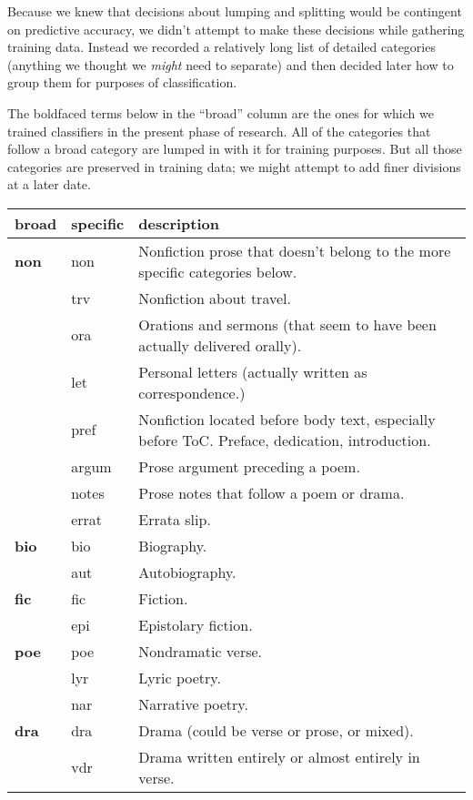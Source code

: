 \documentclass[paper=a4, fontsize=12pt]{scrartcl}
\numberwithin{equation}{section}		%
\numberwithin{figure}{section}			%
\numberwithin{table}{section}				%
\begin{document}
Because we knew that decisions about lumping and splitting would be contingent on predictive accuracy, we didn't attempt to make these decisions while gathering training data. Instead we recorded a relatively long list of detailed categories (anything we thought we \textit{might} need to separate) and then decided later how to group them for purposes of classification.

The boldfaced terms below in the ``broad'' column are the ones for which we trained classifiers in the present phase of research. All of the categories that follow a broad category are lumped in with it for training purposes. But all those categories are preserved in training data; we might attempt to add finer divisions at a later date.

\begin{centering}
\begin{longtable}{ | l | l | p{10cm} |}
\hline
broad & specific & description \\ \hline \hline
\textbf{non} & non & Nonfiction prose that doesn't belong to the more specific categories below. \\ \hline
 & trv & Nonfiction about travel. \\ \hline
 & ora	& Orations and sermons (that seem to have been actually delivered orally). \\ \hline
 & let & Personal letters (actually written as correspondence.) \\ \hline
& pref & Nonfiction located before body text, especially before ToC. Preface, dedication, introduction. \\ \hline
& argum & Prose argument preceding a poem. \\ \hline
& notes & Prose notes that follow a poem or drama. \\ \hline
& errat & Errata slip.  \\ \hline
\textbf{bio} & bio & Biography. \\ \hline
 & aut & Autobiography. \\ \hline
\textbf{fic} & fic & Fiction. \\ \hline
 & epi & Epistolary fiction. \\ \hline
 \textbf{poe} & poe & Nondramatic verse. \\ \hline
& lyr & Lyric poetry. \\ \hline
& nar & Narrative poetry. \\ \hline
\textbf{dra} & dra & Drama (could be verse or prose, or mixed).  \\ \hline
& vdr & Drama written entirely or almost entirely in verse.  \\ \hline

\end{longtable}
\end{centering}
\end{document}
